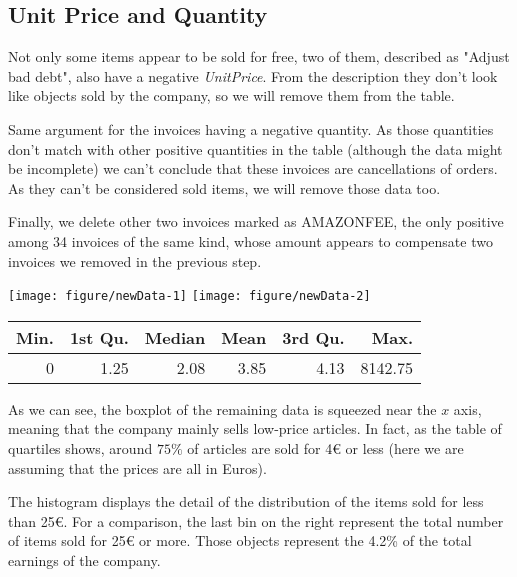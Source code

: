 \documentclass[12pt,a4paper,oneside,italian]{book}\usepackage{knitr}
\begin{document}
\subsection*{Unit Price and Quantity}

Not only some items appear to be sold for free, two of them, described as "Adjust bad debt", also have a negative \textit{UnitPrice}. From the description they don't look like objects sold by the company, so we will remove them from the table. 

Same argument for the invoices having a negative quantity. As those quantities don't match with other positive quantities in the table (although the data might be incomplete) we can't conclude that these invoices are cancellations of orders. As they can't be considered sold items, we will remove those data too.

Finally, we delete other two invoices marked as AMAZONFEE, the only positive among 34 invoices of the same kind, whose amount appears to compensate two invoices we removed in the previous step.
\\




{\centering \texttt{[image: figure/newData-1]} 
\texttt{[image: figure/newData-2]} 

}




\begin{table}[H]
\centering
\begin{tabular}{rrrrrr}
\toprule
Min. & 1st Qu. & Median & Mean & 3rd Qu. & Max.\\
\midrule
0 & 1.25 & 2.08 & 3.85 & 4.13 & 8142.75\\
\bottomrule
\end{tabular}
\end{table}




As we can see, the boxplot of the remaining data is squeezed near the $x$ axis, meaning that the company mainly sells low-price articles. In fact, as the table of quartiles shows, around $75\%$ of articles are sold for 4€ or less (here we are assuming that the prices are all in Euros).





The histogram displays the detail of the distribution of the items sold for less than 25€. For a comparison, the last bin on the right represent the total number of items sold for 25€ or more. Those objects represent the 4.2\% of the total earnings of the company.
\end{document}
